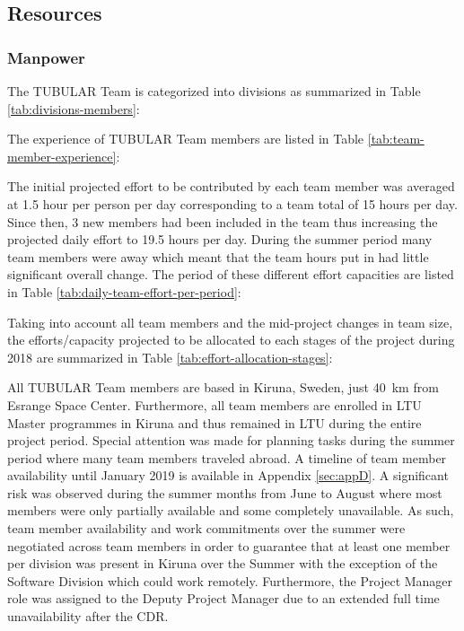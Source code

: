 \subsection{Resources}

\subsubsection{Manpower}
The TUBULAR Team is categorized into divisions as summarized in Table \ref{tab:divisions-members}:



The experience of TUBULAR Team members are listed in Table \ref{tab:team-member-experience}:



The initial projected effort to be contributed by each team member was averaged at 1.5 hour per person per day corresponding to a team total of 15 hours per day. Since then, 3 new members had been included in the team thus increasing the projected daily effort to 19.5 hours per day. During the summer period many team members were away which meant that the team hours put in had little significant overall change. The period of these different effort capacities are listed in Table \ref{tab:daily-team-effort-per-period}:



Taking into account all team members and the mid-project changes in team size, the efforts/capacity projected to be allocated to each stages of the project during 2018 are summarized in Table \ref{tab:effort-allocation-stages}:



All TUBULAR Team members are based in Kiruna, Sweden, just \SI{40}{\kilo\meter} from Esrange Space Center. Furthermore, all team members are enrolled in LTU Master programmes in Kiruna and thus remained in LTU during the entire project period. Special attention was made for planning tasks during the summer period where many team members traveled abroad. A timeline of team member availability  until January 2019 is available in Appendix \ref{sec:appD}. A significant risk was observed during the summer months from June to August where most members were only partially available and some completely unavailable. As such, team member availability and work commitments over the summer were negotiated across team members in order to guarantee that at least one member per division was present in Kiruna over the Summer with the exception of the Software Division which could work remotely. Furthermore, the Project Manager role was assigned to the Deputy Project Manager due to an extended full time unavailability after the CDR.

